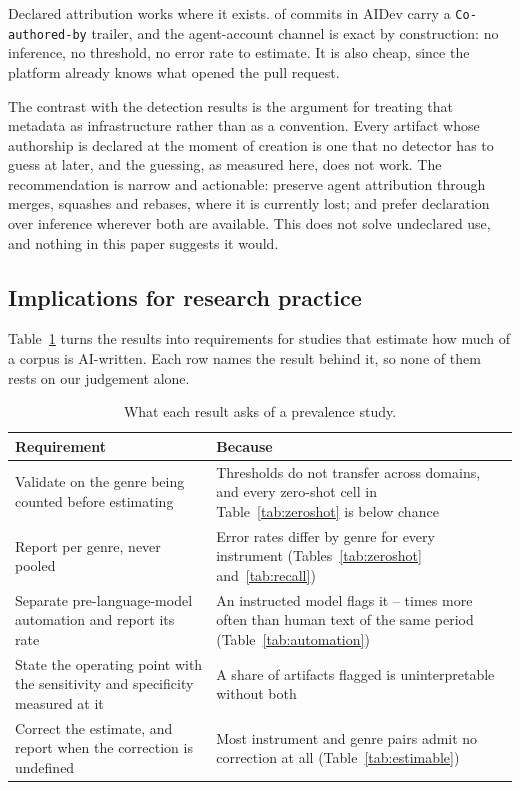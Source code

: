 Declared attribution works where it exists. \AidevTrailerRate{} of commits in AIDev
carry a \texttt{Co-authored-by} trailer, and the agent-account channel is exact by
construction: no inference, no threshold, no error rate to estimate. It is also cheap,
since the platform already knows what opened the pull request.

The contrast with the detection results is the argument for treating that metadata as
infrastructure rather than as a convention. Every artifact whose authorship is declared
at the moment of creation is one that no detector has to guess at later, and the
guessing, as measured here, does not work. The recommendation is narrow and
actionable: preserve agent attribution through merges, squashes and rebases, where it is
currently lost; and prefer declaration over inference wherever both are available. This
does not solve undeclared use, and nothing in this paper suggests it would.

\subsection{Implications for research practice}
\label{sec:discussion:practice}

Table~\ref{tab:checklist} turns the results into requirements for studies that estimate
how much of a corpus is AI-written. Each row names the result behind it, so none of them
rests on our judgement alone.

\begin{table}[t]
\caption{What each result asks of a prevalence study.}
\label{tab:checklist}
\small
\begin{tabular}{@{}p{}p{}@{}}
\toprule
Requirement & Because \\
\midrule
Validate on the genre being counted before estimating &
Thresholds do not transfer across domains, and every zero-shot cell in
Table~\ref{tab:zeroshot} is below chance \\
\addlinespace
Report per genre, never pooled &
Error rates differ by genre for every instrument (Tables~\ref{tab:zeroshot}
and~\ref{tab:recall}) \\
\addlinespace
Separate pre-language-model automation and report its rate &
An instructed model flags it \JudgeBotRatioMin{}--\JudgeBotRatioMax{} times more often
than human text of the same period (Table~\ref{tab:automation}) \\
\addlinespace
State the operating point with the sensitivity and specificity measured at it &
A share of artifacts flagged is uninterpretable without both \\
\addlinespace
Correct the estimate, and report when the correction is undefined &
Most instrument and genre pairs admit no correction at all
(Table~\ref{tab:estimable}) \\
\bottomrule
\end{tabular}
\end{table}

